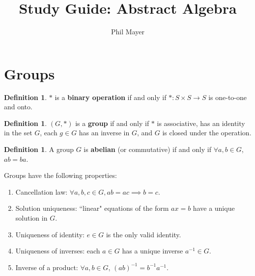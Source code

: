 \documentclass[11pt]{amsart}
\title{Study Guide: Abstract Algebra}
\author{Phil Mayer}
\theoremstyle{definition}
\newtheorem{definition}[theorem]{Definition}
\begin{document}
\maketitle

\section{Groups}
\begin{definition}
	$*$ is a \textbf{binary operation} if and only if $*: S \times S \to S$ is one-to-one and onto.
\end{definition}
\begin{definition}
	$(G, *)$ is a \textbf{group} if and only if $*$ is associative, has an identity in the set $G$, each $g \in G$ has an inverse in $G$,
	and $G$ is closed under the operation.
\end{definition}
\begin{definition}
	A group $G$ is \textbf{abelian} (or commutative) if and only if $\forall a, b \in G$, $ab = ba$.
\end{definition}
Groups have the following properties:
\begin{enumerate}
	\item{Cancellation law: $\forall a, b, c \in G, ab = ac \implies b = c$.}
	\item{Solution uniqueness: ``linear" equations of the form $ax = b$ have a unique solution in $G$.}
	\item{Uniqueness of identity: $e \in G$ is the only valid identity.}
	\item{Uniqueness of inverses: each $a \in G$ has a unique inverse $a^{-1} \in G$.}
	\item{Inverse of a product: $\forall a, b \in G$, $(ab)^{-1} = b^{-1}a^{-1}$.}
\end{enumerate}
\end{document}
